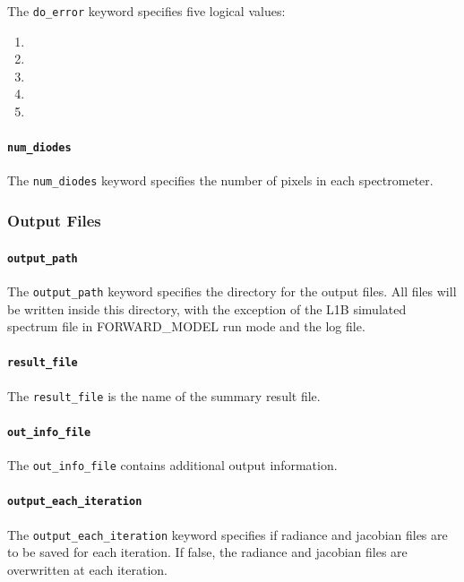 \documentclass{article}
\begin{document}
The \texttt{do\_error} keyword specifies five logical values:
\begin{enumerate}
\item
\item
\item
\item
\item
\end{enumerate}

\paragraph{\texttt{num\_diodes}}

The \texttt{num\_diodes} keyword specifies the number of pixels in
each spectrometer.

\subsubsection{Output Files}

\paragraph{\texttt{output\_path}}

The \texttt{output\_path} keyword specifies the directory for the
output files.  All files will be written inside this directory, with
the exception of the L1B simulated spectrum file in FORWARD\_MODEL run
mode and the log file.

\paragraph{\texttt{result\_file}}

The \texttt{result\_file} is the name of the summary result file.

\paragraph{\texttt{out\_info\_file}}

The \texttt{out\_info\_file} contains additional output information.

\paragraph{\texttt{output\_each\_iteration}}

The \texttt{output\_each\_iteration} keyword specifies if radiance and
jacobian files are to be saved for each iteration.  If false, the
radiance and jacobian files are overwritten at each iteration.
\end{document}

